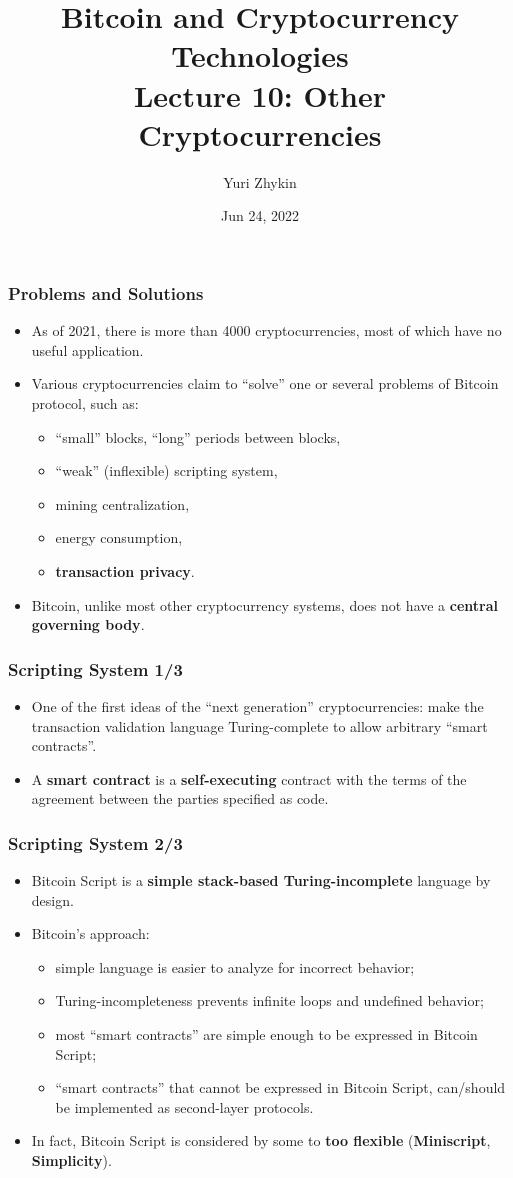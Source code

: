 \documentclass{beamer}
\title{
  Bitcoin and Cryptocurrency Technologies \\
  Lecture 10: Other Cryptocurrencies
}
\author{Yuri Zhykin}
\date{Jun 24, 2022}
\begin{document}
\frame{\titlepage}

\begin{frame}
  \frametitle{Problems and Solutions}
  \begin{itemize}
  \item As of 2021, there is more than 4000 cryptocurrencies, most of which
    have no useful application.
  \item Various cryptocurrencies claim to ``solve'' one or several problems of
    Bitcoin protocol, such as:
    \begin{itemize}
    \item ``small'' blocks, ``long'' periods between blocks,
    \item ``weak'' (inflexible) scripting system,
    \item mining centralization,
    \item energy consumption,
    \item \textbf{transaction privacy}.
    \end{itemize}
  \item Bitcoin, unlike most other cryptocurrency systems, does not have a
    \textbf{central governing body}.
  \end{itemize}
\end{frame}

\begin{frame}
  \frametitle{Scripting System 1/3}
  \begin{itemize}
  \item One of the first ideas of the ``next generation'' cryptocurrencies: make
    the transaction validation language Turing-complete to allow arbitrary
    ``smart contracts''.
  \item A \textbf{smart contract} is a \textbf{self-executing} contract with the
    terms of the agreement between the parties specified as code.
  \end{itemize}
\end{frame}

\begin{frame}
  \frametitle{Scripting System 2/3}
  \begin{itemize}
  \item Bitcoin Script is a \textbf{simple stack-based Turing-incomplete}
    language by design.
  \item Bitcoin's approach:
    \begin{itemize}
    \item simple language is easier to analyze for incorrect behavior;
    \item Turing-incompleteness prevents infinite loops and undefined behavior;
    \item most ``smart contracts'' are simple enough to be expressed in Bitcoin
      Script;
    \item ``smart contracts'' that cannot be expressed in Bitcoin Script,
      can/should be implemented as second-layer protocols.
    \end{itemize}
  \item In fact, Bitcoin Script is considered by some to \textbf{too flexible}
    (\textbf{Miniscript}, \textbf{Simplicity}).
  \end{itemize}
\end{frame}
\end{document}
